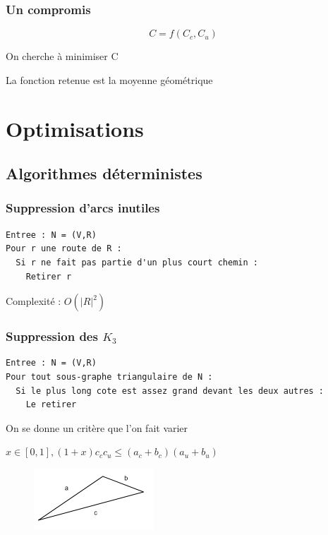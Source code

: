 \documentclass{beamer}[11pt]
\begin{document}
			\begin{frame}
				\frametitle{Un compromis}

				$$ C = f(C_{c},C_{u})$$

				On cherche à minimiser C

				La fonction retenue est la moyenne géométrique

			\end{frame}

	\section{Optimisations}

		\subsection{Algorithmes déterministes}

			\begin{frame}[fragile]
				\frametitle{Suppression d'arcs inutiles}

\begin{verbatim}
Entree : N = (V,R)
Pour r une route de R :
  Si r ne fait pas partie d'un plus court chemin :
    Retirer r
\end{verbatim}

				Complexité : $ O(|R|^{2}) $

			\end{frame}

			\begin{frame}[fragile]
				\frametitle{Suppression des $K_{3}$}

\begin{verbatim}
Entree : N = (V,R)
Pour tout sous-graphe triangulaire de N :
  Si le plus long cote est assez grand devant les deux autres :
    Le retirer
\end{verbatim}

			On se donne un critère que l'on fait varier

			$x \in [0,1], (1+x) c_{c} c_{u} \leq (a_{c} + b_{c})(a_{u} + b_{u})$

			\begin{figure}[t]
				\centering
					\includegraphics[width=0.4\textwidth]{Pics/tri.jpg}
			\end{figure}

			\end{frame}
\end{document}
